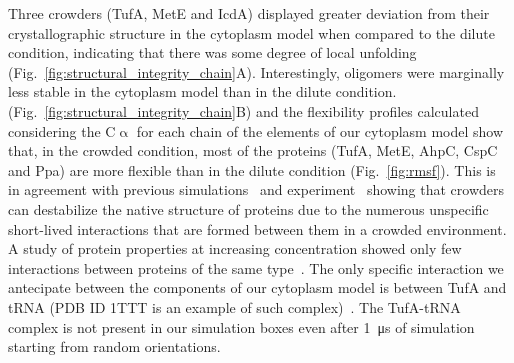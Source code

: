 \documentclass[journal=jcisd8,manuscript=article]{achemso}
\begin{document}
Three crowders (TufA, MetE and IcdA) displayed greater deviation from
their crystallographic structure in the cytoplasm model when compared
to the dilute condition, indicating that there was some degree of
local unfolding
(Fig.~\ref{fig:structural_integrity_chain}A). Interestingly, oligomers
were marginally less stable in the cytoplasm model than in the dilute condition.
(Fig.~\ref{fig:structural_integrity_chain}B) and the flexibility
profiles calculated considering the C$\upalpha$ for each chain of the
elements of our cytoplasm model show that, in the crowded condition,
most of the proteins (TufA, MetE, AhpC, CspC and Ppa) are more flexible than in the dilute condition (Fig.~\ref{fig:rmsf}). This
is in agreement with previous simulations~\cite{Feig2011} and
experiment~\cite{miklos2011,Wang2012b} showing that crowders can
destabilize the native structure of proteins due to the numerous
unspecific short-lived interactions that are formed between them in a
crowded environment. A study of protein properties at increasing
concentration showed only few interactions between proteins of the
same type~\cite{Bashardanesh2019a}. The only specific interaction we antecipate between the components of our cytoplasm model is between TufA and tRNA (PDB ID 1TTT is an example of such complex)~\cite{nissen1995crystal}. The TufA-tRNA complex is not present in our simulation boxes even after \SI{1}{\micro\second} of simulation starting from random orientations.

\end{document}
